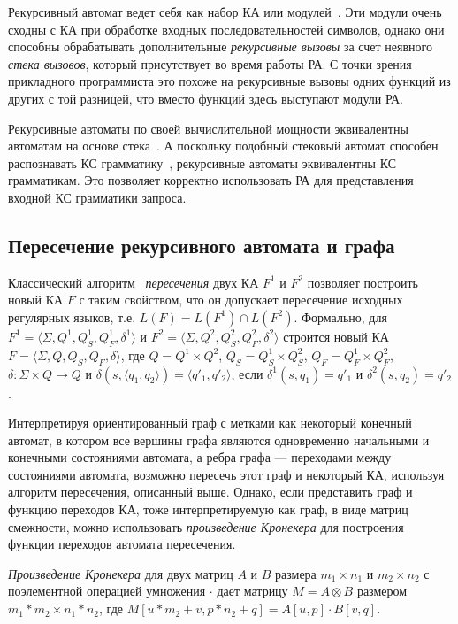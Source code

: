 Рекурсивный автомат ведет себя как набор КА или модулей~\cite{article:recursive_state_machines}. Эти модули очень сходны с КА при обработке входных последовательностей символов, однако они способны обрабатывать дополнительные \textit{рекурсивные вызовы} за счет неявного \textit{стека вызовов}, который присутствует во время работы РА. С точки зрения прикладного программиста это похоже на рекурсивные вызовы одних функций из других с той разницей, что вместо функций здесь выступают модули РА.

Рекурсивные автоматы по своей вычислительной мощности эквивалентны автоматам на основе стека~\cite{article:recursive_state_machines}. А поскольку подобный стековый автомат способен распознавать КС грамматику~\cite{book:automata_theory}, рекурсивные автоматы эквивалентны КС грамматикам. Это позволяет корректно использовать РА для представления входной КС грамматики запроса.

\subsection{Пересечение рекурсивного автомата и графа}

Классический алгоритм~\cite{book:automata_theory} \textit{пересечения} двух КА $F^1$ и $F^2$ позволяет построить новый КА $F$ с таким свойством, что он допускает пересечение исходных регулярных языков, т.е. $L(F) = L(F^1) \cap L(F^2)$. Формально, для $F^1 = \langle \Sigma, Q^1, Q^1_S, Q^1_F, \delta^1 \rangle$ и $F^2 = \langle \Sigma, Q^2, Q^2_S, Q^2_F, \delta^2 \rangle$ строится новый КА $F = \langle \Sigma, Q, Q_S, Q_F, \delta \rangle$, где $Q = Q^1 \times Q^2$, $Q_S = Q^1_S \times Q^2_S$, $Q_F = Q^1_F \times Q^2_F$, $\delta: \Sigma \times Q \rightarrow Q$ и $\delta(s, \langle q_1, q_2 \rangle) = \langle q'_1, q'_2 \rangle$, если $\delta^1 (s, q_1)=q'_1$ и $\delta^2 (s, q_2)=q'_2$. 

Интерпретируя ориентированный граф с метками как некоторый конечный автомат, в котором все вершины графа являются одновременно начальными и конечными состояниями автомата, а ребра графа --- переходами между состояниями автомата, возможно пересечь этот граф и некоторый КА, используя алгоритм пересечения, описанный выше. Однако, если представить граф и функцию переходов КА, тоже интерпретируемую как граф, в виде матриц смежности, можно использовать \textit{произведение Кронекера} для построения функции переходов автомата пересечения.

\textit{Произведение Кронекера} для двух матриц $A$ и $B$ размера $m_1 \times n_1$ и $m_2 \times n_2$ с поэлементной операцией умножения $\cdot$ дает матрицу $M = A \otimes B$ размером $m_1 * m_2 \times n_1 * n_2$, где $M[u * m_2 + v, p * n_2 + q] = A[u, p] \cdot B[v, q]$. 

